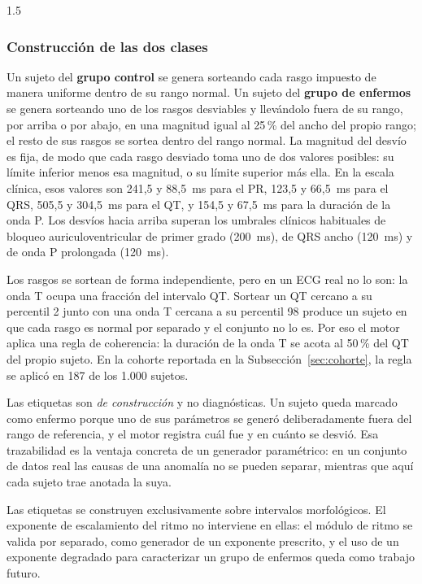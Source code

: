 \begin{spacing}{1.5}
\subsubsection{Construcción de las dos clases}

Un sujeto del \textbf{grupo control} se genera sorteando cada rasgo impuesto de manera uniforme dentro de su rango normal. Un sujeto del \textbf{grupo de enfermos} se genera sorteando uno de los rasgos desviables y llevándolo fuera de su rango, por arriba o por abajo, en una magnitud igual al 25\,\% del ancho del propio rango; el resto de sus rasgos se sortea dentro del rango normal. La magnitud del desvío es fija, de modo que cada rasgo desviado toma uno de dos valores posibles: su límite inferior menos esa magnitud, o su límite superior más ella. En la escala clínica, esos valores son 241,5 y 88,5~ms para el PR, 123,5 y 66,5~ms para el QRS, 505,5 y 304,5~ms para el QT, y 154,5 y 67,5~ms para la duración de la onda P. Los desvíos hacia arriba superan los umbrales clínicos habituales de bloqueo auriculoventricular de primer grado (200~ms), de QRS ancho (120~ms) \cite{surawicz2009aha3} y de onda P prolongada (120~ms).

Los rasgos se sortean de forma independiente, pero en un ECG real no lo son: la onda T ocupa una fracción del intervalo QT. Sortear un QT cercano a su percentil 2 junto con una onda T cercana a su percentil 98 produce un sujeto en que cada rasgo es normal por separado y el conjunto no lo es. Por eso el motor aplica una regla de coherencia: la duración de la onda T se acota al 50\,\% del QT del propio sujeto. En la cohorte reportada en la Subsección~\ref{sec:cohorte}, la regla se aplicó en 187 de los 1.000 sujetos.

Las etiquetas son \emph{de construcción} y no diagnósticas. Un sujeto queda marcado como enfermo porque uno de sus parámetros se generó deliberadamente fuera del rango de referencia, y el motor registra cuál fue y en cuánto se desvió. Esa trazabilidad es la ventaja concreta de un generador paramétrico: en un conjunto de datos real las causas de una anomalía no se pueden separar, mientras que aquí cada sujeto trae anotada la suya.

Las etiquetas se construyen exclusivamente sobre intervalos morfológicos. El exponente de escalamiento del ritmo no interviene en ellas: el módulo de ritmo se valida por separado, como generador de un exponente prescrito, y el uso de un exponente degradado para caracterizar un grupo de enfermos queda como trabajo futuro.


\end{spacing}
